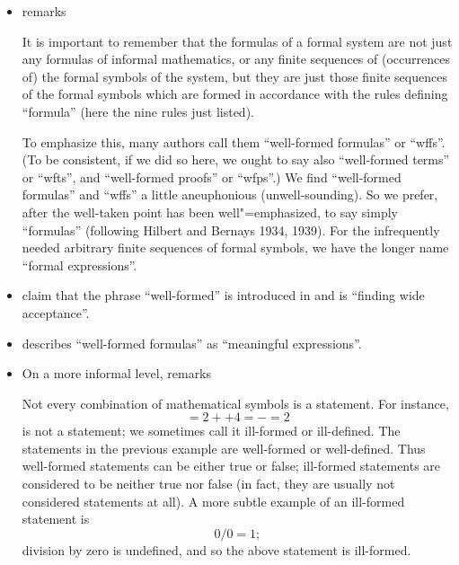 \begin{comments}
\begin{itemize}
    \item \Textcite[217]{Kleene2002Logic} remarks
    \begin{displayquote}
      It is important to remember that the formulas of a formal system are not just any formulas of informal mathematics, or any finite sequences of (occurrences of) the formal symbols of the system, but they are just those finite sequences of the formal symbols which are formed in accordance with the rules defining \enquote{formula} (here the nine rules just listed).

      To emphasize this, many authors call them \enquote{well-formed formulas} or \enquote{wffs}. (To be consistent, if we did so here, we ought to say also \enquote{well-formed terms} or \enquote{wfts}, and \enquote{well-formed proofs} or \enquote{wfps}.) We find \enquote{well-formed formulas} and \enquote{wffs} a little aneuphonious (unwell-sounding). So we prefer, after the well-taken point has been
      well"=emphasized, to say simply \enquote{formulas} (following Hilbert and Bernays 1934, 1939). For the infrequently needed arbitrary finite sequences of formal symbols, we have the longer name \enquote{formal expressions}.
    \end{displayquote}

    \item \Textcite[27]{CurryFeysCraig1958CombinatoryLogicVol1} claim that the phrase \enquote{well-formed} is introduced in \cite[352]{Church1932LambdaCalculus} and is \enquote{finding wide acceptance}.

    \item \Textcite[29]{Andrews2002Logic} describes \enquote{well-formed formulas} as \enquote{meaningful expressions}.

    \item On a more informal level, \textcite[266]{Tao2022AnalysisI} remarks
    \begin{displayquote}
      Not every combination of mathematical symbols is a statement. For instance,
      \begin{equation*}
        = 2 ++ 4 = - = 2
      \end{equation*}
      is not a statement; we sometimes call it ill-formed or ill-defined. The statements in the previous example are well-formed or well-defined. Thus well-formed statements can be either true or false; ill-formed statements are considered to be neither true
      nor false (in fact, they are usually not considered statements at all). A more subtle example of an ill-formed statement is
      \begin{equation*}
        0 / 0 = 1;
      \end{equation*}
      division by zero is undefined, and so the above statement is ill-formed.
    \end{displayquote}


\end{itemize}
\end{comments}
